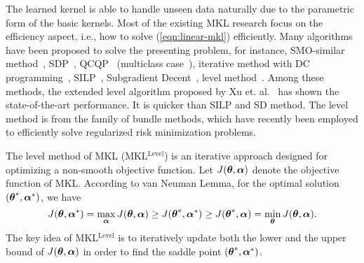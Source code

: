 The learned kernel is able to handle unseen data naturally due to the parametric form of the basic kernels. Most of the existing MKL research focus on the efficiency aspect, i.e., how to solve (\ref{eqn:linear-mkl}) efficiently. Many algorithms have been proposed to solve the presenting problem, for instance, SMO-similar method~\cite{icml/BachLJ04}, SDP~\cite{jmlr/LanckrietCBGJ03}, QCQP~\cite{bioinformatics/LanckrietBCJN04} (multiclass case~\cite{icml/ZienO07}), iterative method with DC programming~\cite{icml/ArgyriouHMP06}, SILP~\cite{nips/SonnenburgRS05,jmlr/SonnenburgRSS06}, Subgradient Decent~\cite{icml/RakotomamonjyBCG07, jmlr/RakotomamonjyBCG08}, level method~\cite{nips/XuJKL08}. Among these methods, the extended level algorithm proposed by Xu et. al.~\cite{nips/XuJKL08} has shown the state-of-the-art performance. It is quicker than SILP and SD method. The level method is from the family of bundle methods, which have recently been employed to efficiently solve regularized risk minimization problems.

The level method of MKL (MKL$^{\mathrm{Level}}$) is an iterative approach designed for optimizing a non-smooth objective function. Let $J(\boldsymbol{\theta}, {\boldsymbol{\alpha}})$ denote the objective function of MKL. According to van Neuman Lemma, for the optimal solution $({\boldsymbol{\theta}}^*,{\boldsymbol{\alpha}}^*)$, we have
\[
J({\boldsymbol{\theta}}, {\boldsymbol{\alpha}}^*) = \max_{\boldsymbol{\alpha}} J({\boldsymbol{\theta}}, {\boldsymbol{\alpha}}) \geq J({\boldsymbol{\theta}}^*, {\boldsymbol{\alpha}}^*) \geq J({\boldsymbol{\theta}}^*, {\boldsymbol{\alpha}}) = \min_{\boldsymbol{\theta}} J({\boldsymbol{\theta}}, {\boldsymbol{\alpha}}).
\]
The key idea of MKL$^{\mathrm{Level}}$ is to iteratively update both the lower and the upper bound of $J({\boldsymbol{\theta}},{\boldsymbol{\alpha}})$\cite{nips/XuJKL08} in order to find the saddle point $({\boldsymbol{\theta}}^*, {\boldsymbol{\alpha}}^*)$.


